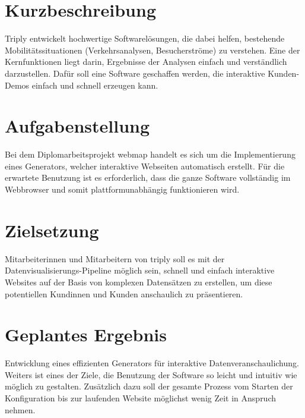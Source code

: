 \section{Kurzbeschreibung}
Triply entwickelt hochwertige Softwarelösungen, die dabei helfen, bestehende Mobilitätssituationen (Verkehrsanalysen,
Besucherströme) zu verstehen.
Eine der Kernfunktionen liegt darin, Ergebnisse der Analysen einfach und verständlich
darzustellen.
Dafür soll eine Software geschaffen werden, die interaktive Kunden-Demos einfach und schnell erzeugen kann.

\section{Aufgabenstellung}
Bei dem Diplomarbeitsprojekt webmap handelt es sich um die Implementierung eines Generators, welcher interaktive
Webseiten automatisch erstellt.
Für die erwartete Benutzung ist es erforderlich, dass die ganze Software vollständig im Webbrowser
und somit plattformunabhängig funktionieren wird.

\section{Zielsetzung}
Mitarbeiterinnen und Mitarbeitern von triply soll es mit der Datenvisualisierungs-Pipeline möglich sein, schnell und einfach
interaktive Websites auf der Basis von komplexen Datensätzen zu erstellen, um diese potentiellen Kundinnen und Kunden
anschaulich zu präsentieren.

\section{Geplantes Ergebnis}
Entwicklung eines effizienten Generators für interaktive Datenveranschaulichung.
Weiters ist eines der Ziele, die Benutzung der Software so leicht und intuitiv wie möglich zu gestalten.
Zusätzlich dazu soll der gesamte
Prozess vom Starten der Konfiguration bis zur laufenden Website möglichst wenig Zeit in Anspruch nehmen.
